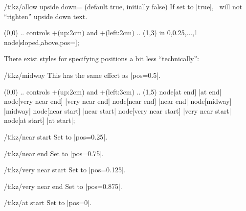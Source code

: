 \begin{key}{/tikz/allow upside down= (default true, initially false)}
  If set to |true|, \tikzname\ will not ``righten'' upside down text.
\begin{codeexample}[]
  \draw (0,0) .. controls +(up:2cm) and +(left:2cm) .. (1,3)
    \foreach \p in {0,0.25,...,1} {node[sloped,above,pos=\p]{\p}};
\end{codeexample}
\begin{codeexample}[]
\end{codeexample}
\end{key}


There exist styles for specifying positions a bit less ``technically'':
\begin{stylekey}{/tikz/midway}
  This has the same effect as |pos=0.5|.
\begin{codeexample}[]
\tikz \draw (0,0) .. controls +(up:2cm) and +(left:3cm) .. (1,5)
       node[at end]          {|at end|}
       node[very near end]   {|very near end|}
       node[near end]        {|near end|}
       node[midway]          {|midway|}
       node[near start]      {|near start|}
       node[very near start] {|very near start|}
       node[at start]        {|at start|};
\end{codeexample}
\end{stylekey}

\begin{stylekey}{/tikz/near start}
  Set to |pos=0.25|.
\end{stylekey}

\begin{stylekey}{/tikz/near end}
  Set to |pos=0.75|.
\end{stylekey}

\begin{stylekey}{/tikz/very near start}
  Set to |pos=0.125|.
\end{stylekey}

\begin{stylekey}{/tikz/very near end}
  Set to |pos=0.875|.
\end{stylekey}

\begin{stylekey}{/tikz/at start}
  Set to |pos=0|.
\end{stylekey}

